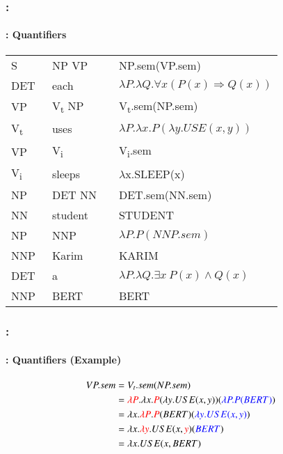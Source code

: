 \documentclass[xcolor=table]{beamer}
\begin{document}
\begin{frame}
	\frametitle{\insertshortsubtitle: \insertsection}
	\framesubtitle{\insertsubsection: Quantifiers}
	
	\begin{center}
		\small\bfseries
		\begin{tabular}{llll}
			\hline\hline
			S  & \textrightarrow\ NP VP && NP.sem(VP.sem) \\
			DET & \textrightarrow\ each && $\lambda P.\lambda Q.\forall x (P(x) \Rightarrow Q(x))$ \\
			
			VP & \textrightarrow\ V\textsubscript{t} NP && V\textsubscript{t}.sem(NP.sem) \\
			V\textsubscript{t}  & \textrightarrow\ uses && $\lambda P.\lambda x.P(\lambda y.USE(x, y))$ \\
			
			VP & \textrightarrow\ V\textsubscript{i} && V\textsubscript{i}.sem \\
			V\textsubscript{i}  & \textrightarrow\ sleeps && $ \lambda $x.SLEEP(x) \\
			
			NP & \textrightarrow\ DET NN && DET.sem(NN.sem) \\
			NN  & \textrightarrow\  student && STUDENT \\
			
			NP & \textrightarrow\ NNP && $\lambda P.P(NNP.sem)$ \\
			NNP  & \textrightarrow\  Karim && KARIM \\
			
			DET & \textrightarrow\ a && $\lambda P.\lambda Q.\exists x\ P(x) \wedge Q(x)$ \\
			NNP  & \textrightarrow\  BERT && BERT \\
			\hline\hline
		\end{tabular}
	\end{center}
	
\end{frame}

\begin{frame}
	\frametitle{\insertshortsubtitle: \insertsection}
	\framesubtitle{\insertsubsection: Quantifiers (Example)}
	
	\begin{center}
		\small
		\begin{align*}
			VP.sem & = V_t.sem(NP.sem) \\
			& = \textcolor{red}{\lambda P}.\lambda x.\textcolor{red}{P}(\lambda y.USE(x, y))(\textcolor{blue}{\lambda P.P(BERT)}) \\
			& = \lambda x.\textcolor{red}{\lambda P}.\textcolor{red}{P}(BERT)(\textcolor{blue}{\lambda y.USE(x, y)}) \\
			& = \lambda x.\textcolor{red}{\lambda y}.USE(x, \textcolor{red}{y})(\textcolor{blue}{BERT}) \\
			& = \lambda x.USE(x, BERT) \\
		\end{align*}
	\end{center}
	
\end{frame}
\end{document}
